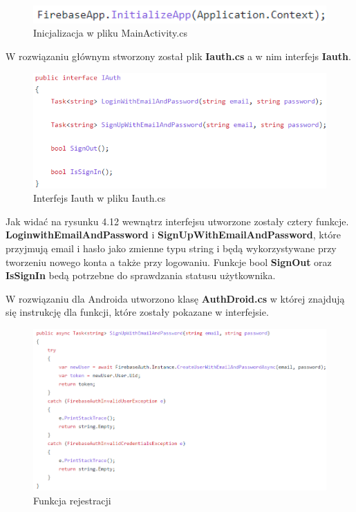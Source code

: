 \begin{figure}[!htb]
	\begin{center}
		\includegraphics[width=12cm]{rys/firebase_main_activity.png}
		\caption{Inicjalizacja w pliku MainActivity.cs}
		\label{rys:rysunek022}
	\end{center}
\end{figure}

W rozwiązaniu głównym  stworzony został plik \textbf{Iauth.cs} a w nim interfejs \textbf{Iauth}.
 
 \begin{figure}[!htb]
 	\begin{center}
 		\includegraphics[width=14cm]{rys/iauth.png}
 		\caption{Interfejs Iauth w pliku Iauth.cs}
 		\label{rys:rysunek023}
 	\end{center}
 \end{figure}

Jak widać na rysunku 4.12 wewnątrz interfejsu utworzone zostały cztery funkcje. \textbf{LoginwithEmailAndPassword}  i \textbf{SignUpWithEmailAndPassword}, które przyjmują email i hasło jako zmienne typu string i będą wykorzystywane przy tworzeniu nowego konta a także przy logowaniu. Funkcje bool \textbf{SignOut} oraz \textbf{IsSignIn} bedą potrzebne do sprawdzania statusu użytkownika. \newline \newline 

W rozwiązaniu dla Androida utworzono klasę \textbf{AuthDroid.cs} w której znajdują się instrukcję dla funkcji, które zostały pokazane w interfejsie. 

\begin{figure}[!htb]
	\begin{center}
		\includegraphics[width=15cm]{rys/authdroid1.png}
		\caption{Funkcja rejestracji}
		\label{rys:rysunek024}
	\end{center}
\end{figure}

